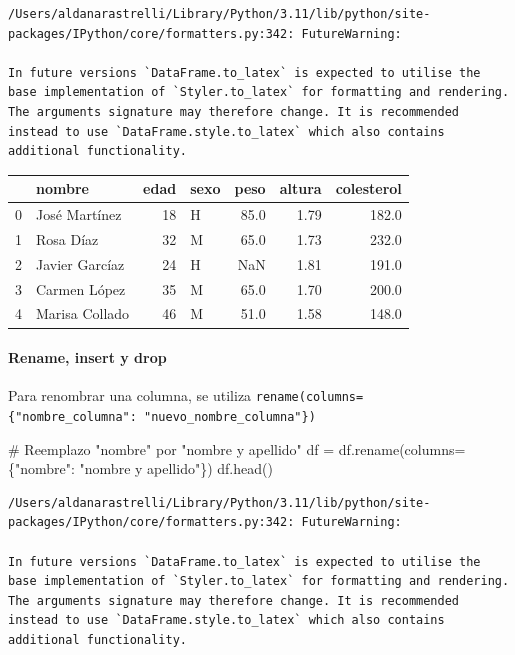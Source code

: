 \documentclass[
  letterpaper,
  DIV=11,
  numbers=noendperiod]{scrreprt}
\let\oldparagraph\paragraph
\renewcommand{\paragraph}[1]{\oldparagraph{#1}\mbox{}}
\newenvironment{Shaded}{\begin{snugshade}}{\end{snugshade}}
\newcommand{\CommentTok}[1]{\textcolor[rgb]{0.37,0.37,0.37}{#1}}
\newcommand{\NormalTok}[1]{\textcolor[rgb]{0.00,0.23,0.31}{#1}}
\newcommand{\OperatorTok}[1]{\textcolor[rgb]{0.37,0.37,0.37}{#1}}
\newcommand{\StringTok}[1]{\textcolor[rgb]{0.13,0.47,0.30}{#1}}
\begin{document}
\begin{verbatim}
/Users/aldanarastrelli/Library/Python/3.11/lib/python/site-packages/IPython/core/formatters.py:342: FutureWarning:

In future versions `DataFrame.to_latex` is expected to utilise the base implementation of `Styler.to_latex` for formatting and rendering. The arguments signature may therefore change. It is recommended instead to use `DataFrame.style.to_latex` which also contains additional functionality.
\end{verbatim}

\begin{tabular}{llrlrrr}
\toprule
{} &          nombre &  edad & sexo &  peso &  altura &  colesterol \\
\midrule
0 &   José Martínez &    18 &    H &  85.0 &    1.79 &       182.0 \\
1 &       Rosa Díaz &    32 &    M &  65.0 &    1.73 &       232.0 \\
2 &  Javier Garcíaz &    24 &    H &   NaN &    1.81 &       191.0 \\
3 &    Carmen López &    35 &    M &  65.0 &    1.70 &       200.0 \\
4 &  Marisa Collado &    46 &    M &  51.0 &    1.58 &       148.0 \\
\bottomrule
\end{tabular}

\paragraph{Rename, insert y drop}\label{rename-insert-y-drop}

Para renombrar una columna, se utiliza
\texttt{rename(columns=\{"nombre\_columna":\ "nuevo\_nombre\_columna"\})}

\begin{Shaded}
\begin{Highlighting}[]
\CommentTok{\# Reemplazo "nombre" por "nombre y apellido"}
\NormalTok{df }\OperatorTok{=}\NormalTok{ df.rename(columns}\OperatorTok{=}\NormalTok{\{}\StringTok{"nombre"}\NormalTok{: }\StringTok{"nombre y apellido"}\NormalTok{\})}
\NormalTok{df.head()}
\end{Highlighting}
\end{Shaded}

\begin{verbatim}
/Users/aldanarastrelli/Library/Python/3.11/lib/python/site-packages/IPython/core/formatters.py:342: FutureWarning:

In future versions `DataFrame.to_latex` is expected to utilise the base implementation of `Styler.to_latex` for formatting and rendering. The arguments signature may therefore change. It is recommended instead to use `DataFrame.style.to_latex` which also contains additional functionality.
\end{verbatim}
\end{document}
